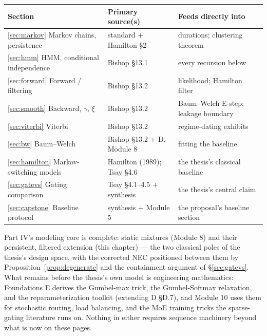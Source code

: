 \documentclass[11pt]{article}
\numberwithin{equation}{section}
\theoremstyle{plain}
\theoremstyle{definition}
\theoremstyle{remark}
\begin{document}
\begin{center}
\small
\begin{tabular}{@{}lll@{}}
\toprule
Section & Primary source(s) & Feeds directly into \\
\midrule
\ref{sec:markov} Markov chains, persistence & standard + Hamilton \S2 & durations; clustering theorem \\
\ref{sec:hmm} HMM, conditional independence & Bishop \S13.1 & every recursion below \\
\ref{sec:forward} Forward / filtering & Bishop \S13.2 & likelihood; Hamilton filter \\
\ref{sec:smooth} Backward, $\gamma$, $\xi$ & Bishop \S13.2 & Baum--Welch E-step; leakage boundary \\
\ref{sec:viterbi} Viterbi & Bishop \S13.2 & regime-dating exhibits \\
\ref{sec:bw} Baum--Welch & Bishop \S13.2 + D, Module 8 & fitting the baseline \\
\ref{sec:hamilton} Markov-switching models & Hamilton (1989); Tsay \S4.6 & the thesis's classical baseline \\
\ref{sec:gatevs} Gating comparison & Tsay \S4.1--4.5 + synthesis & the thesis's central claim \\
\ref{sec:capstone} Baseline protocol & synthesis + Module 5 & the proposal's baseline section \\
\bottomrule
\end{tabular}
\end{center}

\medskip
Part IV's modeling core is complete: static mixtures (Module 8) and their persistent, filtered extension (this chapter) --- the two classical poles of the thesis's design space, with the corrected NEC positioned between them by Proposition~\ref{prop:degenerate} and the containment argument of \S\ref{sec:gatevs}. What remains before the thesis's own model is engineering mathematics: Foundations E derives the Gumbel-max trick, the Gumbel-Softmax relaxation, and the reparameterization toolkit (extending D \S D.7), and Module 10 uses them for stochastic routing, load balancing, and the MoE training tricks the sparse-gating literature runs on. Nothing in either requires sequence machinery beyond what is now on these pages.
\end{document}

